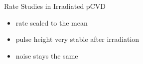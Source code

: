 \begin{frame}{Rate Studies in Irradiated pCVD}

	\vspace*{-15pt}
	
	\begin{itemize}\itemfill
		\item rate scaled to the mean
		\item pulse height very stable after irradiation
		\item noise stays the same
	\end{itemize}

\end{frame}


